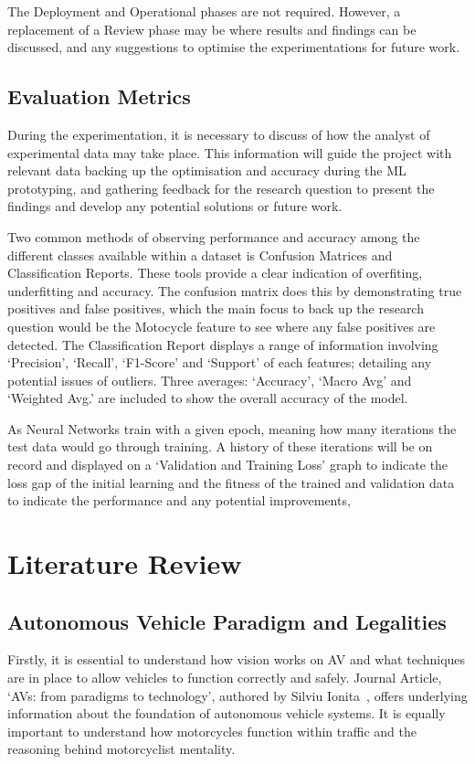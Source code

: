 \documentclass[12pt]{report} %
\begin{document}
        The Deployment and Operational phases are not required. However, a replacement of a Review phase may be where results and findings can be discussed, and any suggestions to optimise the experimentations for future work.

	\section{Evaluation Metrics}
        During the experimentation, it is necessary to discuss of how the analyst of experimental data may take place. This information will guide the project with relevant data backing up the optimisation and accuracy during the ML prototyping, and gathering feedback for the research question to present the findings and develop any potential solutions or future work.

        Two common methods of observing performance and accuracy among the different classes available within a dataset is Confusion Matrices and Classification Reports. These tools provide a clear indication of overfiting, underfitting and accuracy. The confusion matrix does this by demonstrating true positives and false positives, which the main focus to back up the research question would be the Motocycle feature to see where any false positives are detected. The Classification Report displays a range of information involving `Precision', `Recall', `F1-Score' and `Support' of each features; detailing any potential issues of outliers. Three averages: `Accuracy', `Macro Avg' and `Weighted Avg.' are included to show the overall accuracy of the model.~\cite{liang_confusion_2022}~\cite{panigrahi_deep_2018}

        As Neural Networks train with a given epoch, meaning how many iterations the test data would go through training. A history of these iterations will be on record and displayed on a `Validation and Training Loss' graph to indicate the loss gap of the initial learning and the fitness of the trained and validation data to indicate the performance and any potential improvements,~\cite{panigrahi_deep_2018}

\chapter{Literature Review}
\label{chap:literatureReview}
	\section{Autonomous Vehicle Paradigm and Legalities}
		Firstly, it is essential to understand how vision works on AV and what techniques are in place to allow vehicles to function correctly and safely. Journal Article, `AVs: from paradigms to technology', authored by Silviu Ionita~\cite{ionita_autonomous_2017}, offers underlying information about the foundation of autonomous vehicle systems. It is equally important to understand how motorcycles function within traffic and the reasoning behind motorcyclist mentality.
\end{document}
